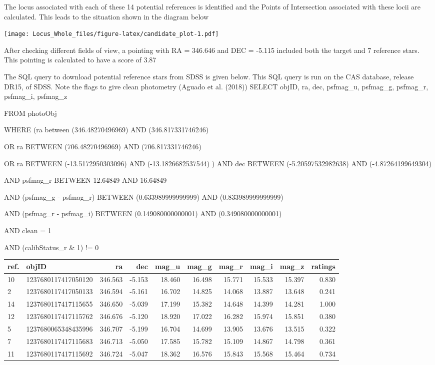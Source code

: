 \documentclass[]{elsarticle} %
\makeatletter
\def\maxwidth{\ifdim\Gin@nat@width>\linewidth\linewidth
\else\Gin@nat@width\fi}
\let\Oldincludegraphics\includegraphics
\renewcommand{\includegraphics}[1]{\Oldincludegraphics[width=\maxwidth]{#1}}
\makeatother
\begin{document}
The locus associated with each of these 14 potential references is
identified and the Points of Intersection associated with these locii
are calculated. This leads to the situation shown in the diagram below

\texttt{[image: Locus\_Whole\_files/figure-latex/candidate\_plot-1.pdf]}

After checking different fields of view, a pointing with RA = 346.646
and DEC = -5.115 included both the target and 7 reference stars. This
pointing is calculated to have a score of 3.87 \newpage

The SQL query to download potential reference stars from SDSS is given
below. This SQL query is run on the CAS database, release DR15, of SDSS.
Note the flags to give clean photometry (Aguado et al. (2018))
\vskip 0.2in \noindent SELECT objID, ra, dec, psfmag\_u, psfmag\_g,
psfmag\_r, psfmag\_i, psfmag\_z

FROM photoObj

WHERE (ra between (346.48270496969) AND (346.817331746246)

OR ra BETWEEN (706.48270496969) AND (706.817331746246)

OR ra BETWEEN (-13.5172950303096) AND (-13.1826682537544) ) AND dec
BETWEEN (-5.20597532982638) AND (-4.87264199649304)

AND psfmag\_r BETWEEN 12.64849 AND 16.64849

AND (psfmag\_g - psfmag\_r) BETWEEN (0.633989999999999) AND
(0.833989999999999)

AND (psfmag\_r - psfmag\_i) BETWEEN (0.149080000000001) AND
(0.349080000000001)

AND clean = 1

AND (calibStatus\_r \& 1) != 0 \vskip 0.2in

\begin{tabular}{l|l|r|r|r|r|r|r|r|r}
\hline
ref. & objID & ra & dec & mag\_u & mag\_g & mag\_r & mag\_i & mag\_z & ratings\\
\hline
10 & 1237680117417050120 & 346.563 & -5.153 & 18.460 & 16.498 & 15.771 & 15.533 & 15.397 & 0.830\\
\hline
2 & 1237680117417050133 & 346.594 & -5.161 & 16.702 & 14.825 & 14.068 & 13.887 & 13.648 & 0.241\\
\hline
14 & 1237680117417115655 & 346.650 & -5.039 & 17.199 & 15.382 & 14.648 & 14.399 & 14.281 & 1.000\\
\hline
12 & 1237680117417115762 & 346.676 & -5.120 & 18.920 & 17.022 & 16.282 & 15.974 & 15.851 & 0.380\\
\hline
5 & 1237680065348435996 & 346.707 & -5.199 & 16.704 & 14.699 & 13.905 & 13.676 & 13.515 & 0.322\\
\hline
7 & 1237680117417115683 & 346.713 & -5.050 & 17.585 & 15.782 & 15.109 & 14.867 & 14.798 & 0.361\\
\hline
11 & 1237680117417115692 & 346.724 & -5.047 & 18.362 & 16.576 & 15.843 & 15.568 & 15.464 & 0.734\\
\hline
\end{tabular}
\end{document}
